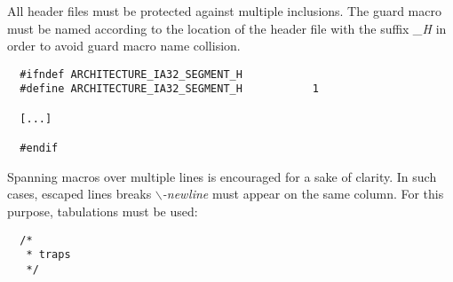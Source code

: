 All header files must be protected against multiple inclusions. The
guard macro must be named according to the location of the header file
with the suffix \textit{\_H} in order to avoid guard macro name collision.

\begin{verbatim}
  #ifndef ARCHITECTURE_IA32_SEGMENT_H
  #define ARCHITECTURE_IA32_SEGMENT_H           1

  [...]

  #endif
\end{verbatim}

Spanning macros over multiple lines is encouraged for a sake of clarity. In
such cases, escaped lines breaks \textit{$\backslash$-newline} must appear
on the same column. For this purpose, tabulations must be used:

\begin{verbatim}
  /*
   * traps
   */


\end{verbatim}
